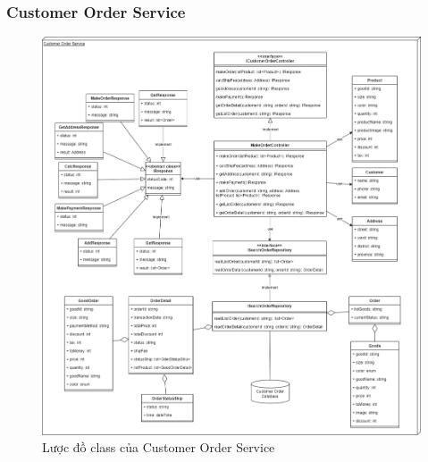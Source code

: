 \subsubsection{Customer Order Service}
\begin{figure}[!htp]
	\centering
	\includegraphics[width=13cm]{img/Architecture/service/CustomerOrderService.png}
	\newline
	\caption{Lược đồ class của Customer Order Service}
\end{figure}




